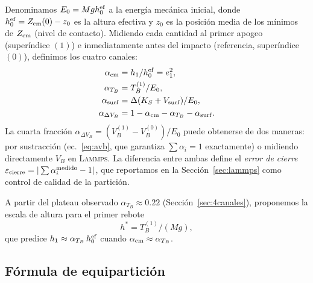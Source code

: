 \documentclass[aps,pre,twocolumn,reprint,superscriptaddress]{revtex4-2}
\newcommand{\lammps}{\textsc{Lammps}}
\begin{document}
Denominamos $E_0 = Mg h_0^{\rm ef}$ a la energía mecánica inicial, donde
$h_0^{\rm ef}=Z_{\rm cm}(0)-z_0$ es la altura efectiva y $z_0$ es la posición
media de los mínimos de $Z_{\rm cm}$ (nivel de contacto). Midiendo cada
cantidad al primer apogeo (superíndice $(1)$) e inmediatamente antes del
impacto (referencia, superíndice $(0)$), definimos los cuatro canales:
\begin{align}
    \alpha_{\rm cm}         &= h_1/h_0^{\rm ef} = e_1^2, \label{eq:acm}\\
    \alpha_{T_B}            &= T_B^{(1)}/E_0,   \label{eq:atb}\\
    \alpha_{\rm surf}       &= \Delta(K_S + V_{\rm surf})/E_0, \label{eq:asurf}\\
    \alpha_{\Delta V_B}     &= 1-\alpha_{\rm cm}-\alpha_{T_B}-\alpha_{\rm surf}.
    \label{eq:avb}
\end{align}
La cuarta fracción $\alpha_{\Delta V_B}=(V_B^{(1)}-V_B^{(0)})/E_0$ puede
obtenerse de dos maneras: por sustracción (ec.~\eqref{eq:avb}, que garantiza
$\sum\alpha_i=1$ exactamente) o midiendo directamente $V_B$ en \lammps{}.
La diferencia entre ambas define el \emph{error de cierre}
$\varepsilon_{\rm cierre}=|\sum\alpha_i^{\rm medido}-1|$, que reportamos en
la Sección~\ref{sec:lammps} como control de calidad de la partición.

A partir del plateau observado $\alpha_{T_B}\approx0.22$ (Sección~\ref{sec:4canales}),
proponemos la escala de altura para el primer rebote
\begin{equation}
    h^* = T_B^{(1)}/(Mg),
    \label{eq:hstar}
\end{equation}
que predice $h_1\approx\alpha_{T_B}\,h_0^{\rm ef}$ cuando
$\alpha_{\rm cm}\approx\alpha_{T_B}$.

\subsection{Fórmula de equipartición}
\label{sec:equiparticion}
\end{document}
